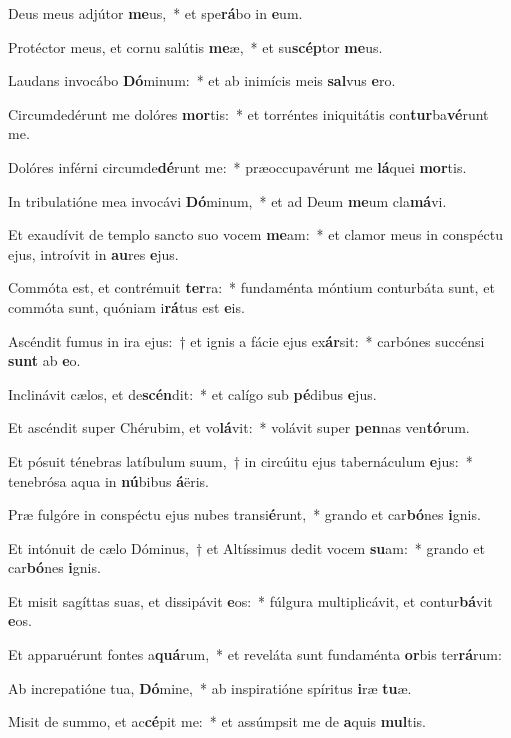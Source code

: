 \item Deus meus adjútor \textbf{me}us,~* et spe\textbf{rá}bo in \textbf{e}um.
\item Protéctor meus, et cornu salútis \textbf{me}æ,~* et su\textbf{scép}tor \textbf{me}us.
\item Laudans invocábo \textbf{Dó}minum:~* et ab inimícis meis \textbf{sal}vus \textbf{e}ro.
\item Circumdedérunt me dolóres \textbf{mor}tis:~* et torréntes iniquitátis con\textbf{tur}ba\textbf{vé}runt me.
\item Dolóres inférni circumde\textbf{dé}runt me:~* præoccupavérunt me \textbf{lá}quei \textbf{mor}tis.
\item In tribulatióne mea invocávi \textbf{Dó}minum,~* et ad Deum \textbf{me}um cla\textbf{má}vi.
\item Et exaudívit de templo sancto suo vocem \textbf{me}am:~* et clamor meus in conspéctu ejus, introívit in \textbf{au}res \textbf{e}jus.
\item Commóta est, et contrémuit \textbf{ter}ra:~* fundaménta móntium conturbáta sunt, et commóta sunt, quóniam i\textbf{rá}tus est \textbf{e}is.
\item Ascéndit fumus in ira ejus:~† et ignis a fácie ejus ex\textbf{ár}sit:~* carbónes succénsi \textbf{sunt} ab \textbf{e}o.
\item Inclinávit cælos, et de\textbf{scén}dit:~* et calígo sub \textbf{pé}dibus \textbf{e}jus.
\item Et ascéndit super Chérubim, et vo\textbf{lá}vit:~* volávit super \textbf{pen}nas ven\textbf{tó}rum.
\item Et pósuit ténebras latíbulum suum,~† in circúitu ejus tabernáculum \textbf{e}jus:~* tenebrósa aqua in \textbf{nú}bibus \textbf{á}ëris.
\item Præ fulgóre in conspéctu ejus nubes transi\textbf{é}runt,~* grando et car\textbf{bó}nes \textbf{i}gnis.
\item Et intónuit de cælo Dóminus,~† et Altíssimus dedit vocem \textbf{su}am:~* grando et car\textbf{bó}nes \textbf{i}gnis.
\item Et misit sagíttas suas, et dissipávit \textbf{e}os:~* fúlgura multiplicávit, et contur\textbf{bá}vit \textbf{e}os.
\item Et apparuérunt fontes a\textbf{quá}rum,~* et reveláta sunt fundaménta \textbf{or}bis ter\textbf{rá}rum:
\item Ab increpatióne tua, \textbf{Dó}mine,~* ab inspiratióne spíritus \textbf{i}ræ \textbf{tu}æ.
\item Misit de summo, et ac\textbf{cé}pit me:~* et assúmpsit me de \textbf{a}quis \textbf{mul}tis.
